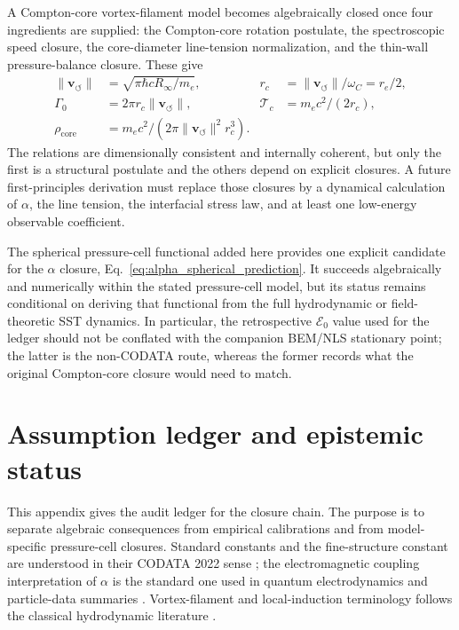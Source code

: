 \documentclass[aps,pra,preprint,longbibliography,nofootinbib]{revtex4-2}
\newcommand{\vnorm}{\lVert\mathbf{v}_{\!\boldsymbol{\circlearrowleft}}\rVert} %
\newcommand{\rhocore}{\rho_{\mathrm{core}}}      %
\newcommand{\rc}{r_c}                            %
\newcommand{\Tc}{\mathcal{T}_c}                  %
\newcommand{\Gz}{\Gamma_0}                       %
\newcommand{\Et}{\mathcal{E}_0}                    %
\begin{document}
A Compton-core vortex-filament model becomes algebraically closed once
four ingredients are supplied: the Compton-core rotation postulate, the
spectroscopic speed closure, the core-diameter line-tension
normalization, and the thin-wall pressure-balance closure.  These give
\begin{align*}
  \vnorm  &= \sqrt{\pi\hbar cR_\infty/m_e},
  &\rc    &= \vnorm/\omega_C = r_e/2, \\
  \Gz     &= 2\pi\rc\vnorm,
  &\Tc    &= m_ec^2/(2\rc),\\
  \rhocore &= m_ec^2/(2\pi\vnorm^2\rc^3).
\end{align*}
The relations are dimensionally consistent and internally coherent, but
only the first is a structural postulate and the others depend on
explicit closures.  A future first-principles derivation must replace
those closures by a dynamical calculation of $\alpha$, the line tension,
the interfacial stress law, and at least one low-energy observable
coefficient.


The spherical pressure-cell functional added here provides one explicit
candidate for the $\alpha$ closure,
Eq.~\eqref{eq:alpha_spherical_prediction}.  It succeeds algebraically and
numerically within the stated pressure-cell model, but its status remains
conditional on deriving that functional from the full hydrodynamic or
field-theoretic SST dynamics.  In particular, the retrospective \(\Et\)
value used for the ledger should not be conflated with the companion
BEM/NLS stationary point; the latter is the non-CODATA route, whereas the
former records what the original Compton-core closure would need to match.



\appendix

\section{Assumption ledger and epistemic status}
\label{app:assumptions}

This appendix gives the audit ledger for the closure chain.  The purpose is
to separate algebraic consequences from empirical calibrations and from
model-specific pressure-cell closures.  Standard constants and the
fine-structure constant are understood in their CODATA 2022 sense
\cite{MohrTaylor2022}; the electromagnetic coupling interpretation of
$\alpha$ is the standard one used in quantum electrodynamics and particle-data
summaries \cite{PeskinSchroeder1995,PDG2022}.  Vortex-filament and
local-induction terminology follows the classical hydrodynamic literature
\cite{Batchelor1967,Saffman1992,Donnelly1991}.
\end{document}
